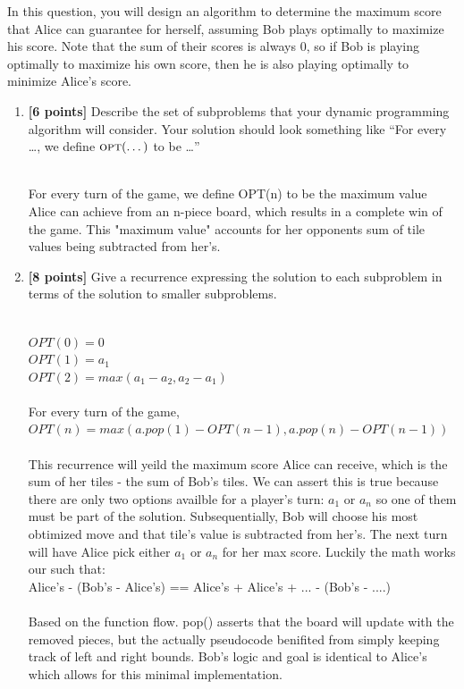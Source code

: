 \documentclass[11pt]{article}
\newcommand{\opt}{\textsc{opt}}
\theoremstyle{definition}
\theoremstyle{theorem}
\newcommand{\solution}{\medskip\noindent{\color{DarkBlue}\textbf{Solution:}}}
\begin{document}
In this question, you will design an algorithm to determine the maximum score that Alice can guarantee for herself, assuming Bob plays optimally to maximize his score.  Note that the sum of their scores is always $0$, so if Bob is playing optimally to maximize his own score, then he is also playing optimally to minimize Alice's score.


\begin{enumerate}[label=(\alph*)]
\item  \textbf{[6 points]} Describe the set of subproblems that your dynamic programming algorithm will consider.  Your solution should look something like ``For every \dots, we define $\opt(\dots)$ to be \dots''

\solution \\
For every turn of the game, we define OPT(n) to be the maximum value Alice can achieve from an n-piece board, which results in a complete win of the game. This "maximum value" accounts for her opponents sum of tile values being subtracted from her's.

\item  \textbf{[8 points]} Give a recurrence expressing the solution to each subproblem in terms of the solution to smaller subproblems.

\solution \\

$OPT(0) = 0$\\
$OPT(1) = a_1$\\
$OPT(2) = max(a_1 - a_2, a_2 - a_1)$\\\\
For every turn of the game, $OPT(n) = max(a.pop(1) - OPT(n-1), a.pop(n) - OPT(n-1))$\\
\\
This recurrence will yeild the maximum score Alice can receive, which is the sum of her tiles - the sum of Bob's tiles.
We can assert this is true because there are only two options availble for a player's turn: $a_1$ or $a_n$ so one of them must be part of the solution.
Subsequentially, Bob will choose his most obtimized move and that tile's value is subtracted from her's.  The next turn will have Alice pick either $a_1$ or $a_n$ for her max score. 
Luckily the math works our such that:\\Alice's - (Bob's - Alice's) == Alice's + Alice's + ... - (Bob's - ....)\\\\
Based on the function flow. pop() asserts that the board will update with the removed pieces, but the actually pseudocode benifited from simply keeping track of left and right bounds. Bob's logic and goal is identical to Alice's which allows for this minimal implementation.\\




\end{enumerate}
\end{document}

